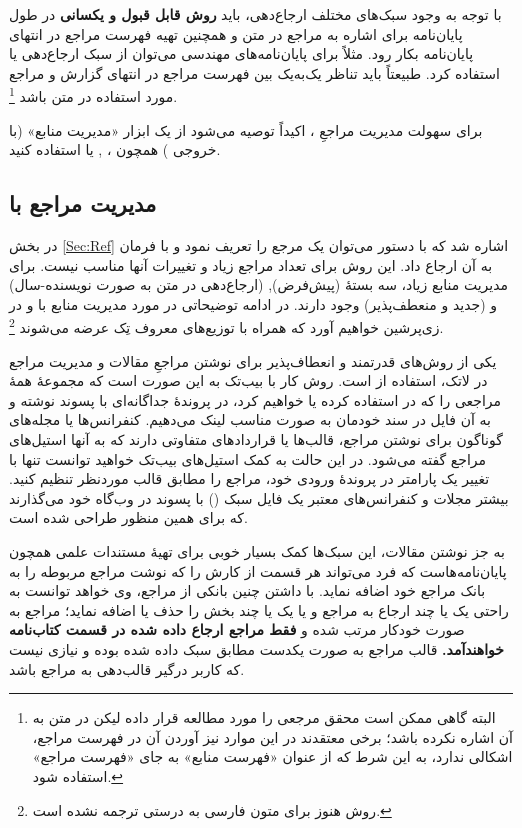 با توجه به وجود سبک‌های مختلف ارجاع‌دهی، باید
\textbf{روش قابل قبول و یکسانی}
در طول پایان‌نامه برای اشاره به مراجع در متن و همچنین تهیه فهرست مراجع در انتهای پایان‌نامه بکار رود. مثلاً برای پایان‌نامه‌های مهندسی می‌توان از سبک ارجاع‌دهی
%
یا
استفاده کرد. طبیعتاً باید تناظر یک‌به‌یک بین فهرست مراجع در انتهای گزارش و مراجع مورد استفاده در متن باشد%
\footnote{البته گاهی ممکن است محقق مرجعی را مورد مطالعه قرار داده لیکن در متن به آن اشاره نکرده باشد؛ برخی معتقدند در این موارد نیز آوردن آن در فهرست مراجع، اشکالی ندارد، به این شرط که از عنوان «فهرست منابع» به جای «فهرست مراجع» استفاده شود.}.

برای سهولت مدیریت مراجعِ \پ%
، اکیداً توصیه می‌شود از یک ابزار «مدیریت منابع» (با خروجی
\texorpdfstring{}{Bib\TeX}%
) همچون
،
,
یا
استفاده کنید.

\subsection{ مدیریت مراجع با  \texorpdfstring{}{Bib\TeX}}
در بخش \ref{Sec:Ref} اشاره شد که با دستور
می‌توان یک مرجع را تعریف نمود و با فرمان
به آن ارجاع داد. این روش برای تعداد مراجع زیاد و تغییرات آنها مناسب نیست. برای مدیریت منابع زیاد، سه بستهٔ
 (پیش‌فرض),
(ارجاع‌دهی در متن به صورت نویسنده-سال)
و  (جدید و منعطف‌پذیر)
وجود دارند. در ادامه توضیحاتی در مورد مدیریت منابع با  و  در زی‌پرشین خواهیم آورد که همراه با توزیع‌های معروف تِک عرضه می‌شوند
\footnote{روش  هنوز برای متون فارسی به درستی ترجمه نشده است.}.

یکی از روش‌های قدرتمند و انعطاف‌پذیر برای نوشتن مراجعِ مقالات و مدیریت مراجع در لاتک، استفاده از   است.
روش کار با بیب‌تک به این صورت است که مجموعهٔ همهٔ مراجعی را که در \پ استفاده کرده یا خواهیم کرد،
در پروندهٔ جداگانه‌ای با پسوند
نوشته و به آن فایل در سند خودمان به صورت مناسب لینک می‌دهیم.
کنفرانس‌ها یا مجله‌های گوناگون برای نوشتن مراجع، قالب‌ها یا قراردادهای متفاوتی دارند که به آنها استیل‌های مراجع گفته می‌شود.
در این حالت به کمک ‌استیل‌های بیب‌تک خواهید توانست تنها با تغییر یک پارامتر در پروندهٔ ورودی خود، مراجع را مطابق قالب موردنظر تنظیم کنید.
بیشتر مجلات و کنفرانس‌های معتبر یک فایل سبک
()
با پسوند  در وب‌گاه خود می‌گذارند که برای همین منظور طراحی شده است.

به جز نوشتن مقالات، این سبک‌ها کمک بسیار خوبی برای تهیهٔ مستندات علمی همچون پایان‌نامه‌هاست که فرد می‌تواند هر قسمت از کارش را که نوشت مراجع مربوطه را به بانک مراجع خود اضافه نماید. با داشتن چنین بانکی از مراجع، وی خواهد توانست به راحتی یک یا چند ارجاع به مراجع و یا یک یا چند بخش را حذف یا اضافه ‌نماید؛
مراجع به صورت خودکار مرتب شده و
\textbf{فقط مراجع ارجاع داده شده در قسمت کتاب‌نامه خواهندآمد.}
قالب مراجع به صورت یکدست مطابق سبک داده شده بوده و نیازی نیست که کاربر درگیر قالب‌دهی به مراجع باشد.

